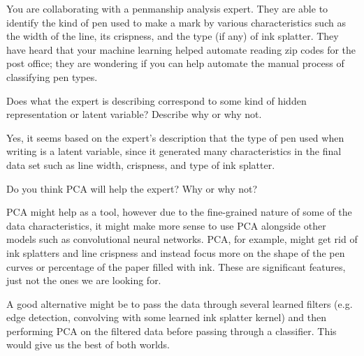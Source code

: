 \documentclass[expanded]{lkx_pset}
\begin{document}
\begin{parts}
	\begin{part}{6} You are collaborating with a penmanship analysis expert.  They
		are able to identify the kind of pen used to make a mark by various
		characteristics such as the width of the line, its crispness, and
		the type (if any) of ink splatter.  They have heard that your
		machine learning helped automate reading zip codes for the post
		office; they are wondering if you can help automate the manual
		process of classifying pen types.
	\end{part}
	\begin{parts}
		\begin{part}{} Does what the expert is describing correspond to some kind
			of hidden representation or latent variable?  Describe why or
			why not.
		\end{part}

		Yes, it seems based on the expert's description that the type of pen used when writing is a latent variable, since it generated many characteristics in the final data set such as line width, crispness, and type of ink splatter.

		\begin{part}{} Do you think PCA will help the expert?  Why or why not?
		\end{part}

		PCA might help as a tool, however due to the fine-grained nature of some of the data characteristics, it might make more sense to use PCA alongside other models such as convolutional neural networks. PCA, for example, might get rid of ink splatters and line crispness and instead focus more on the shape of the pen curves or percentage of the paper filled with ink. These are significant features, just not the ones we are looking for.

		A good alternative might be to pass the data through several learned filters (e.g. edge detection, convolving with some learned ink splatter kernel) and then performing PCA on the filtered data before passing through a classifier. This would give us the best of both worlds.
	\end{parts}
\end{parts}
\end{document}
